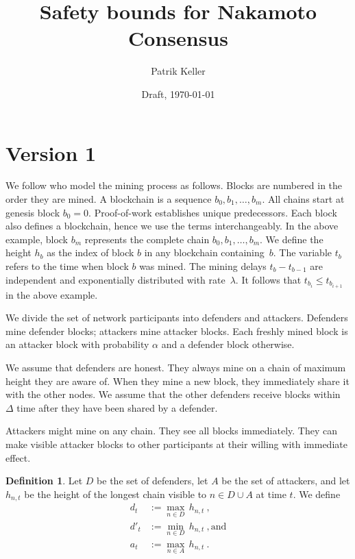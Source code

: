 \documentclass[12pt]{article}
\theoremstyle{definition}
\newtheorem{definition}{Definition}
\begin{document}
\title{Safety bounds for Nakamoto Consensus}
\author{Patrik Keller}
\date{Draft, \today}
\maketitle

\section{Version 1} \label{sec:v1}

We follow \citet{guo2022BitcoinLatency} who model the mining process as follows.
Blocks are numbered in the order they are mined.
A blockchain is a sequence $b_0, b_1, \dots, b_m$.
All chains start at genesis block $b_0 = 0$.
Proof-of-work establishes unique predecessors.
Each block also defines a blockchain, hence we use the terms interchangeably.
In the above example, block $b_m$ represents the complete chain $b_0, b_1, \dots, b_m$.
We define the height $h_b$ as the index of block $b$ in any blockchain containing~$b$.
%
The variable $t_b$ refers to the time when block $b$ was mined.
The mining delays $t_b - t_{b-1}$ are independent and exponentially distributed with rate~$\lambda$.
It follows that $t_{b_i} \leq t_{b_{i+1}}$ in the above example.

We divide the set of network participants into defenders and attackers.
Defenders mine defender blocks; attackers mine attacker blocks.
Each freshly mined block is an attacker block with probability $\alpha$ and a defender block otherwise.

We assume that defenders are honest.
They always mine on a chain of maximum height they are aware of.
When they mine a new block, they immediately share it with the other nodes.
We assume that the other defenders receive blocks within $\Delta$ time after they have been shared by a defender.

Attackers might mine on any chain.
They see all blocks immediately.
They can make visible attacker blocks to other participants at their willing with immediate effect.

\begin{definition} \label{def:ts}
  Let $D$ be the set of defenders,
  let $A$ be the set of attackers, and
  let $h_{n,t}$ be the height of the longest chain visible to $n \in D \cup A$ at time $t$.
  We define
  \begin{align}
    d_t & := \max_{n \in D} \, h_{n, t} ~,\\
    d'_t & := \min_{n \in D} \, h_{n, t} ~, \text{and}\\
    a_t & := \max_{n \in A} \, h_{n, t} ~.
  \end{align}
\end{definition}
\end{document}
